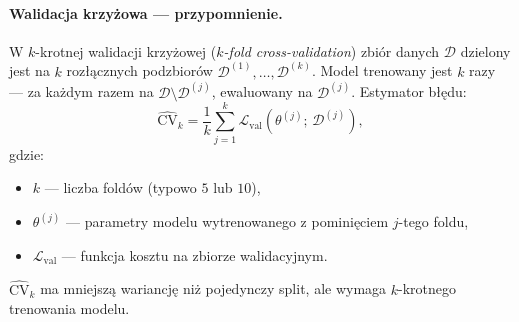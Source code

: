 \documentclass[12pt,a4paper]{article}
\begin{document}
\paragraph{Walidacja krzyżowa --- przypomnienie.}
W $k$-krotnej walidacji krzyżowej (\textit{$k$-fold cross-validation}) \citep{stone1974cv,kohavi1995cv} zbiór danych $\mathcal{D}$ dzielony jest na $k$ rozłącznych podzbiorów $\mathcal{D}^{(1)},\dots,\mathcal{D}^{(k)}$. Model trenowany jest $k$ razy --- za każdym razem na $\mathcal{D}\setminus\mathcal{D}^{(j)}$, ewaluowany na $\mathcal{D}^{(j)}$. Estymator błędu:
\begin{equation}
\widehat{\mathrm{CV}}_k = \frac{1}{k}\sum_{j=1}^{k} \mathcal{L}_{\text{val}}\!\left(\theta^{(j)};\, \mathcal{D}^{(j)}\right),
\end{equation}
gdzie:
\begin{itemize}[leftmargin=1.5em]
    \item $k$ --- liczba foldów (typowo $5$ lub $10$),
    \item $\theta^{(j)}$ --- parametry modelu wytrenowanego z pominięciem $j$-tego foldu,
    \item $\mathcal{L}_{\text{val}}$ --- funkcja kosztu na zbiorze walidacyjnym.
\end{itemize}
$\widehat{\mathrm{CV}}_k$ ma mniejszą wariancję niż pojedynczy split, ale wymaga $k$-krotnego trenowania modelu.
\end{document}

